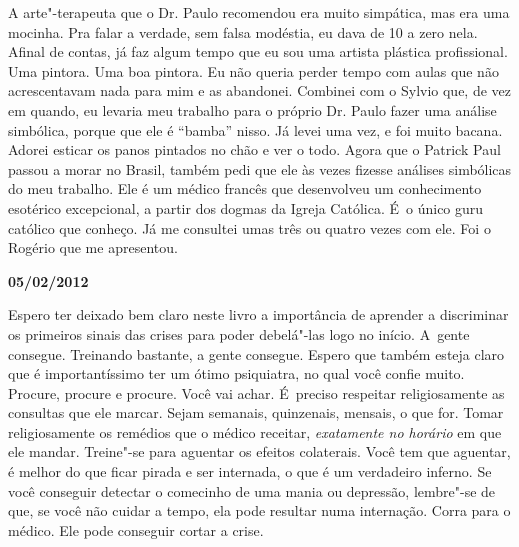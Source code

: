 A arte"-terapeuta que o Dr. Paulo recomendou era muito simpática, mas era
uma mocinha. Pra falar a verdade, sem falsa modéstia, eu dava de 10 a
zero nela. Afinal de contas, já faz algum tempo que eu sou uma artista
plástica profissional. Uma pintora. Uma boa pintora. Eu não queria
perder tempo com aulas que não acrescentavam nada para mim e as
abandonei. Combinei com o Sylvio que, de vez em quando, eu levaria meu
trabalho para o próprio Dr. Paulo fazer uma análise simbólica, porque
que ele é ``bamba'' nisso. Já levei uma vez, e foi muito bacana. Adorei
esticar os panos pintados no chão e ver o todo. Agora que o Patrick Paul
passou a morar no Brasil, também pedi que ele às vezes fizesse análises
simbólicas do meu trabalho. Ele é um médico francês que desenvolveu um
conhecimento esotérico excepcional, a partir dos dogmas da Igreja
Católica. É~o único guru católico que conheço. Já me consultei umas três
ou quatro vezes com ele. Foi o Rogério que me apresentou.

\begin{center}\asterisc{}\end{center}

\begin{flushright}\textbf{05/02/2012}\end{flushright}


Espero ter deixado bem claro neste livro a importância de aprender a
discriminar os primeiros sinais das crises para poder debelá"-las logo no
início. A~gente consegue. Treinando bastante, a gente consegue. Espero
que também esteja claro que é importantíssimo ter um ótimo psiquiatra,
no qual você confie muito. Procure, procure e procure. Você vai achar. É~preciso respeitar religiosamente as consultas que ele marcar. Sejam
semanais, quinzenais, mensais, o que for. Tomar religiosamente os
remédios que o médico receitar, \emph{exatamente no horário}\textbf{} em
que ele mandar. Treine"-se para aguentar os efeitos colaterais. Você tem
que aguentar, é melhor do que ficar pirada e ser internada, o que é um
verdadeiro inferno. Se você conseguir detectar o comecinho de uma mania
ou depressão, lembre"-se de que, se você não cuidar a tempo, ela pode
resultar numa internação. Corra para o médico. Ele pode conseguir cortar
a crise.

